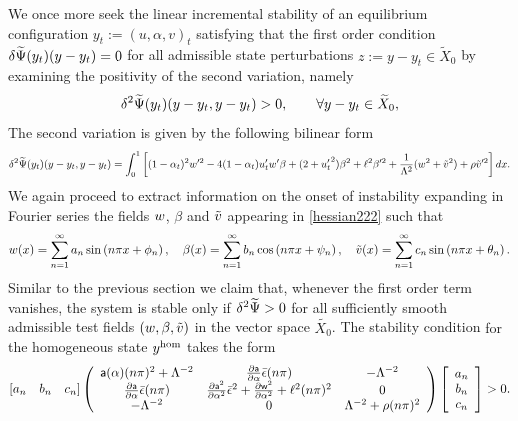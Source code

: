 \documentclass[10pt]{article}
\begin{document}
We once more seek the linear incremental stability of an equilibrium configuration $y_t := (u, \alpha,  v)_t$ satisfying that the first order condition $\delta \widetilde\Psi(y_t)(y-y_t)=0$ for all admissible state perturbations $z:=y-y_t\in\widetilde X_0$ by examining the positivity of the second variation, namely
\begin{equation*}
    \delta^2 \widetilde\Psi(y_t)(y-y_t, y-y_t)>0, \qquad \forall y-y_t\in \widetilde X_0,
\end{equation*}The second variation is given by the following bilinear form
\begin{equation}
    \delta^2 \widetilde\Psi(y_t)(y-y_t, y-y_t)=\int_0^1 \left[(1-\alpha_t)^2w'^2
        - 4(1-\alpha_t)u_t' w'\beta+(2+ {u_t'}^2)\beta^2+\ell^2\beta'^2 +\frac{1}{\Lambda^2}( w^2 + \tilde v^2)+\rho \tilde v'^2\right]dx.\label{hessian222}\end{equation}
We again proceed to extract information on the onset of instability expanding in Fourier series the fields $w$, $\beta$ and $\tilde v$ appearing in \eqref{hessian222} such that
\[
    w(x) = \sum_{n=1}^{\infty} a_{n} \sin \left(n \pi x + \phi_{n}\right),
    \quad\beta(x) = \sum_{n=1}^{\infty} b_{n} \cos \left(n \pi x + \psi_{n}\right),
    \quad\tilde v(x) = \sum_{n=1}^{\infty} c_{n} \sin \left(n \pi x + \theta_{n}\right).
\]
%
Similar to the previous section we claim that, whenever the first order term vanishes, the system is stable only if $\delta^2 \widetilde\Psi
    >0$ for all sufficiently smooth admissible test fields $(w, \beta, \tilde v)$ in the vector space $\widetilde{ X_0}$. The stability condition {for the homogeneous state $y^{\text{hom}}$}  takes the form
\begin{align}
    \left[ a_n \quad b_n \quad c_n \right]\left(
    \begin{array}{ccc}
            \mathsf{a}(\alpha)(n\pi)^2+\Lambda^{-2}                     & \frac{\partial \mathsf{a}}{\partial \alpha}\bar\epsilon(n\pi)                                                                      & -\Lambda^{-2}                      \\
            \frac{\partial \mathsf{a}}{\partial \alpha}\bar\epsilon(n\pi) & \frac{\partial \mathsf{a}^2}{\partial \alpha^2}\bar\epsilon^2+ \frac{\partial \mathsf{w}^2}{\partial \alpha^2}+\ell^2(n\pi)^2 & 0                                    \\
            -\Lambda^{-2}                                            & 0                                                                                                                               & \Lambda^{-2} +\rho (n\pi)^2 \\
        \end{array}
    \right)\left[ \begin{array}{c} a_n \\ b_n \\c_n \end{array} \right]>0.\label{hessian3}\end{align}
\end{document}
